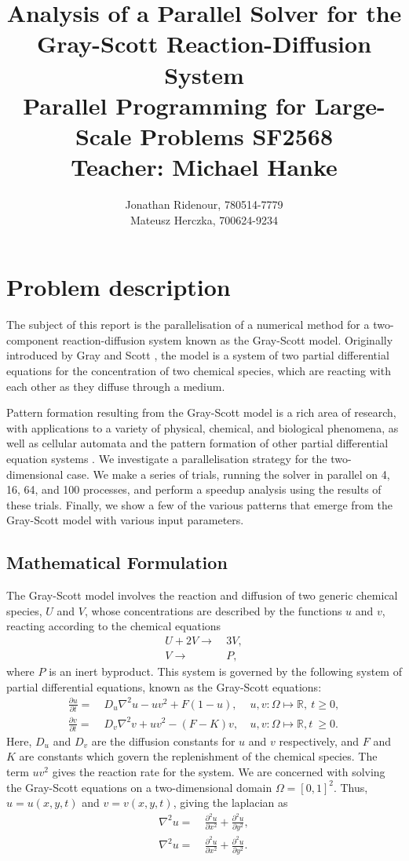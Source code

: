 \documentclass[a4paper,11pt]{article}
\title{ Analysis of a Parallel Solver for the Gray-Scott Reaction-Diffusion System\\ 
\vspace{1.2cm}
\large Parallel Programming for Large-Scale Problems SF2568 \\ 
Teacher: Michael Hanke}
\author{Jonathan Ridenour, 780514-7779\\
Mateusz Herczka, 700624-9234}
\newcommand{\ba}[1]{\begin{align*}    #1    \end{align*}}
\newcommand{\ban}[1]{\begin{align}    #1    \end{align}}
\begin{document}
\maketitle
\pagebreak
\section*{Problem description}
The subject of this report is the parallelisation of a numerical method for a two-component reaction-diffusion system known as the Gray-Scott model.  Originally introduced by Gray and Scott \cite{Gray}, the model is a system of two partial differential equations for the concentration of two chemical species, which are reacting with each other as they diffuse through a medium.

Pattern formation resulting from the Gray-Scott model is a rich area of research, with applications to a variety of physical, chemical, and biological phenomena, as well as cellular automata and the pattern formation of other partial differential equation systems \cite{Wang}.  We investigate a parallelisation strategy for the two-dimensional case.  We make a series of trials, running the solver in parallel on 4, 16, 64, and 100 processes, and perform a speedup analysis using the results of these trials. Finally, we show a few of the various patterns that emerge from the Gray-Scott model with various input parameters.

\subsection*{Mathematical Formulation}
The Gray-Scott model involves the reaction and diffusion of two generic chemical species, $U$ and $V$, whose concentrations are described by the functions $u$ and $v$, reacting according to the chemical equations
\ba{
U + 2V \rightarrow  & \ 3V,\\
V \rightarrow  & \ P,
}
where $P$ is an inert byproduct.  This system is governed by the following system of partial differential equations, known as the Gray-Scott equations:
\begingroup
\addtolength{\jot}{0.5 em}
\ban{
\label{eq:gsu}
\frac{\partial u}{\partial t} = & \ D_u \nabla^2u - uv^2 + F(1-u), & \ u,v: \Omega \mapsto \mathbb{R}, \ t\ge 0,  \\
\label{eq:gsv}
\frac{\partial v}{\partial t} = & \ D_v \nabla^2v + uv^2 - (F-K)v , & \ u,v: \Omega \mapsto \mathbb{R}, t \ \ge 0.
}
\endgroup
Here, $D_u$ and $D_v$ are the diffusion constants for $u$ and $v$ respectively, and $F$ and $K$ are constants which govern the replenishment of the chemical species.  The term $uv^2$ gives the reaction rate for the system.  We are concerned with solving the Gray-Scott equations on a two-dimensional domain $\Omega = [0,1]^2$.  Thus, $u = u(x,y,t)$ and $v = v(x,y,t)$, giving the laplacian as
\ba{
\nabla^2u = & \ \frac{\partial^2 u}{\partial x^2} + \frac{\partial^2 u}{\partial y^2}, \\
\nabla^2u = & \ \frac{\partial^2 u}{\partial x^2} + \frac{\partial^2 u}{\partial y^2}.
}
\end{document}
